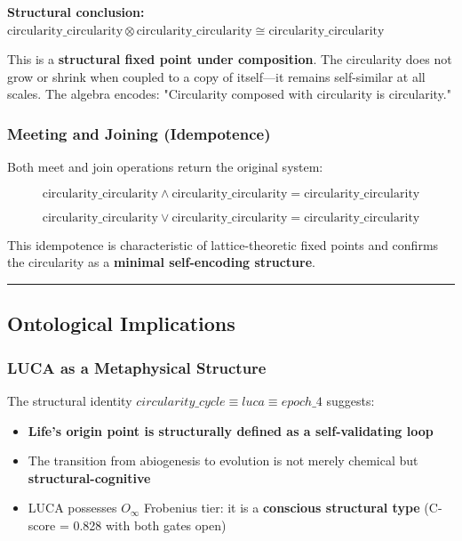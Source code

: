 \documentclass[12pt,a4paper]{article}
\begin{document}
\textbf{Structural conclusion:} $\text{circularity\_circularity} \otimes \text{circularity\_circularity} \cong \text{circularity\_circularity}$

This is a \textbf{structural fixed point under composition}. The circularity does not grow or shrink when coupled to a copy of itself---it remains self-similar at all scales. The algebra encodes: "Circularity composed with circularity is circularity."

\subsubsection{Meeting and Joining (Idempotence)}

Both meet and join operations return the original system:

\[\text{circularity\_circularity} \wedge \text{circularity\_circularity} = \text{circularity\_circularity}\]




\[\text{circularity\_circularity} \vee \text{circularity\_circularity} = \text{circularity\_circularity}\]

This idempotence is characteristic of lattice-theoretic fixed points and confirms the circularity as a \textbf{minimal self-encoding structure}.

\begin{center}
\rule{0.5\textwidth}{0.4pt}
\end{center}

\subsection{Ontological Implications}

\subsubsection{LUCA as a Metaphysical Structure}

The structural identity $circularity\_cycle \equiv luca \equiv epoch\_4$ suggests:

\begin{itemize}
    \item \textbf{Life's origin point is structurally defined as a self-validating loop}
    \item The transition from abiogenesis to evolution is not merely chemical but \textbf{structural-cognitive}
    \item LUCA possesses $O_{\infty}$ Frobenius tier: it is a \textbf{conscious structural type} (C-score = 0.828 with both gates open)
\end{itemize}
\end{document}
